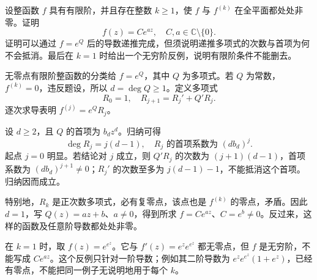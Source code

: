 \begin{exercise}[无零点导数的有限阶限制]\label{b3:ex:20-draft-07}
设整函数 \(f\) 具有有限阶，并且存在整数 \(k\ge1\)，使 \(f\) 与 \(f^{(k)}\) 在全平面都处处非零。证明
\[
 f(z)=Ce^{az},\quad C,a\in\mathbb C\setminus\{0\}.
\]
证明可以通过 \(f=e^Q\) 后的导数递推完成，但须说明递推多项式的次数与首项为何不会抵消。最后在 \(k=1\) 时给出一个无穷阶反例，说明有限阶条件不能删去。
\end{exercise}
\begin{solution}
无零点有限阶整函数的分类给 \(f=e^Q\)，其中 \(Q\) 为多项式。若 \(Q\) 为常数，\(f^{(k)}=0\)，违反题设，所以 \(d=\deg Q\ge1\)。定义多项式
\[
 R_0=1,\quad R_{j+1}=R_j'+Q'R_j.
\]
逐次求导表明 \(f^{(j)}=e^Q R_j\)。

设 \(d\ge2\)，且 \(Q\) 的首项为 \(b_dz^d\)。归纳可得
\[
 \deg R_j=j(d-1),\quad
 R_j\text{ 的首项系数为 }(db_d)^j.
\]
起点 \(j=0\) 明显。若结论对 \(j\) 成立，则 \(Q'R_j\) 的次数为 \((j+1)(d-1)\)，首项系数为 \((db_d)^{j+1}\ne0\)；\(R_j'\) 的次数至多为 \(j(d-1)-1\)，不能抵消这个首项。归纳因而成立。

特别地，\(R_k\) 是正次数多项式，必有复零点，该点也是 \(f^{(k)}\) 的零点，矛盾。因此 \(d=1\)，写 \(Q(z)=az+b\)、\(a\ne0\)，得到所求 \(f=Ce^{az}\)、\(C=e^b\ne0\)。反过来，这样的函数及任意阶导数都处处非零。

在 \(k=1\) 时，取 \(f(z)=e^{e^z}\)。它与
\(f'(z)=e^ze^{e^z}\) 都无零点，但 \(f\) 是无穷阶，不能写成 \(Ce^{az}\)。这个反例只针对一阶导数；例如其二阶导数为 \(e^ze^{e^z}(1+e^z)\)，已经有零点，不能把同一例子无说明地用于每个 \(k\)。
\end{solution}

